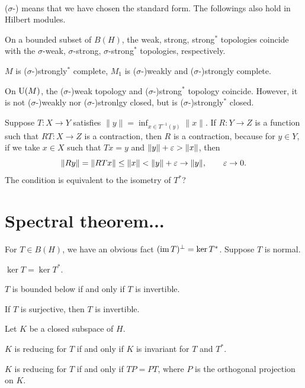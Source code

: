 \documentclass{../../large}
\begin{document}
\begin{prb}[]
\,

($\sigma$-) means that we have chosen the standard form.
The followings also hold in Hilbert modules.
\begin{parts}
\item On a bounded subset of $B(H)$, the weak, strong, strong$^*$ topologies coincide with the $\sigma$-weak, $\sigma$-strong, $\sigma$-strong$^*$ topologies, respectively.
\item $M$ is ($\sigma$-)strongly$^*$ complete, $M_1$ is ($\sigma$-)weakly and ($\sigma$-)strongly complete.
\item On $\mathrm{U}(M)$, the ($\sigma$-)weak topology and ($\sigma$-)strong$^*$ topology coincide. However, it is not ($\sigma$-)weakly nor ($\sigma$-)stronlgy closed, but is ($\sigma$-)strongly$^*$ closed.
\end{parts}
\end{prb}




Suppose $T:X\to Y$ satisfies $\|y\|=\inf_{x\in T^{-1}(y)}\|x\|$.
If $R:Y\to Z$ is a function such that $RT:X\to Z$ is a contraction, then $R$ is a contraction, because for $y\in Y$, if we take $x\in X$ such that $Tx=y$ and $\|y\|+\varepsilon>\|x\|$, then
\[\|Ry\|=\|RTx\|\le\|x\|<\|y\|+\varepsilon\to\|y\|,\qquad\varepsilon\to0.\]
The condition is equivalent to the isometry of $T^*$?


\section{Spectral theorem...}

\begin{prb}
For $T\in B(H)$, we have an obvious fact $(\operatorname{im} T)^\perp=\ker T^*$.
Suppose $T$ is normal.
\begin{parts}
\item $\ker T=\ker T^*$.
\item $T$ is bounded below if and only if $T$ is invertible.
\item If $T$ is surjective, then $T$ is invertible.
\end{parts}
\end{prb}

\begin{prb}
Let $K$ be a closed subspace of $H$.
\begin{parts}
\item $K$ is reducing for $T$ if and only if $K$ is invariant for $T$ and $T^*$.
\item $K$ is reducing for $T$ if and only if $TP=PT$, where $P$ is the orthogonal projection on $K$.
\end{parts}
\end{prb}
\end{document}
